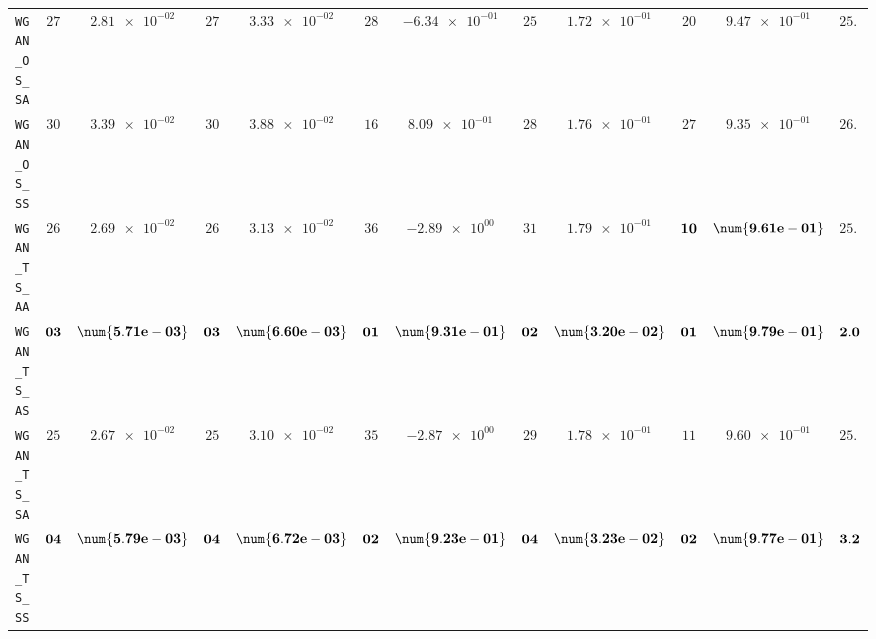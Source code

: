 \begin{xltabular}{\textwidth}{l||cC|cC|cC|cC|cC||c}
	\texttt{WGAN\_OS\_SA} & $ 27$ & $ \num{2.81e-02}$ & $ 27$ & $ \num{3.33e-02}$ & $ 28$ & $ \num{-6.34e-01}$ & $ 25$ & $ \num{1.72e-01}$ & $ 20$ & $ \num{9.47e-01}$ & $ 25.4$  \\
	\texttt{WGAN\_OS\_SS} & $ 30$ & $ \num{3.39e-02}$ & $ 30$ & $ \num{3.88e-02}$ & $ 16$ & $ \num{8.09e-01}$ & $ 28$ & $ \num{1.76e-01}$ & $ 27$ & $ \num{9.35e-01}$ & $ 26.2$  \\
	\texttt{WGAN\_TS\_AA} & $ 26$ & $ \num{2.69e-02}$ & $ 26$ & $ \num{3.13e-02}$ & $ 36$ & $ \num{-2.89e+00}$ & $ 31$ & $ \num{1.79e-01}$ & $\bf 10$ & $\bf \num{9.61e-01}$ & $ 25.8$  \\
	\texttt{WGAN\_TS\_AS} & $\bf 03$ & $\bf \num{5.71e-03}$ & $\bf 03$ & $\bf \num{6.60e-03}$ & $\bf 01$ & $\bf \num{9.31e-01}$ & $\bf 02$ & $\bf \num{3.20e-02}$ & $\bf 01$ & $\bf \num{9.79e-01}$ & $\bf 2.0$  \\
	\texttt{WGAN\_TS\_SA} & $ 25$ & $ \num{2.67e-02}$ & $ 25$ & $ \num{3.10e-02}$ & $ 35$ & $ \num{-2.87e+00}$ & $ 29$ & $ \num{1.78e-01}$ & $ 11$ & $ \num{9.60e-01}$ & $ 25.0$  \\
	\texttt{WGAN\_TS\_SS} & $\bf 04$ & $\bf \num{5.79e-03}$ & $\bf 04$ & $\bf \num{6.72e-03}$ & $\bf 02$ & $\bf \num{9.23e-01}$ & $\bf 04$ & $\bf \num{3.23e-02}$ & $\bf 02$ & $\bf \num{9.77e-01}$ & $\bf 3.2$  \\ \midrule

\end{xltabular}
